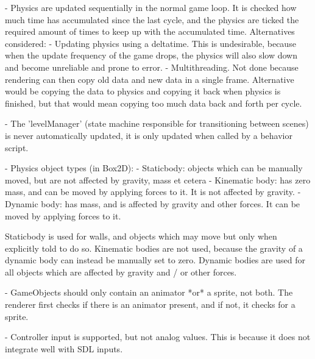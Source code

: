 - Physics are updated sequentially in the normal game loop. It is checked how much time has accumulated since the last cycle, and the physics are ticked the required amount of times to keep up with the accumulated time.
  Alternatives considered:
    - Updating physics using a deltatime. This is undesirable, because when the update frequency of the game drops, the physics will also slow down and become unreliable and prone to error.
    - Multithreading. Not done because rendering can then copy old data and new data in a single frame. Alternative would be copying the data to physics and copying it back when physics is finished, but that would mean copying too much data back and forth per cycle.

- The 'levelManager' (state machine responsible for transitioning between scenes) is never automatically updated, it is only updated when called by a behavior script.

- Physics object types (in Box2D):
  - Staticbody: objects which can be manually moved, but are not affected by gravity, mass et cetera
  - Kinematic body: has zero mass, and can be moved by applying forces to it. It is not affected by gravity.
  - Dynamic body: has mass, and is affected by gravity and other forces. It can be moved by applying forces to it.

Staticbody is used for walls, and objects which may move but only when explicitly told to do so.
Kinematic bodies are not used, because the gravity of a dynamic body can instead be manually set to zero.
Dynamic bodies are used for all objects which are affected by gravity and / or other forces.

- GameObjects should only contain an animator *or* a sprite, not both. The renderer first checks if there is an animator present, and if not, it checks for a sprite.

- Controller input is supported, but not analog values. This is because it does not integrate well with SDL inputs.